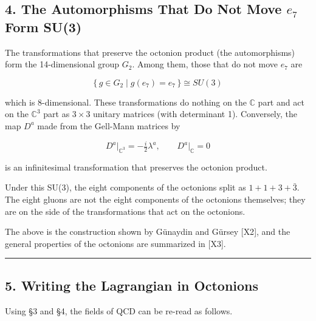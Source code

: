 \documentclass[
  a4paper,
]{article}
\begin{document}
\subsection{\texorpdfstring{4. The Automorphisms That Do Not Move
\(e_7\) Form
SU(3)}{4. The Automorphisms That Do Not Move e\_7 Form SU(3)}}\label{the-automorphisms-that-do-not-move-e_7-form-su3}

The transformations that preserve the octonion product (the
automorphisms) form the 14-dimensional group \(G_2\). Among them, those
that do not move \(e_7\) are

\[
\{\,g \in G_2 \mid g(e_7) = e_7\,\} \cong SU(3) \tag{4.1}
\]

which is 8-dimensional. These transformations do nothing on the
\(\mathbb{C}\) part and act on the \(\mathbb{C}^3\) part as \(3\times3\)
unitary matrices (with determinant 1). Conversely, the map \(D^a\) made
from the Gell-Mann matrices by

\[
D^a\big|_{\mathbb{C}^3} = -\tfrac{i}{2}\lambda^a,\qquad D^a\big|_{\mathbb{C}} = 0 \tag{4.2}
\]

is an infinitesimal transformation that preserves the octonion product.

Under this SU(3), the eight components of the octonions split as
\(1 + 1 + 3 + \bar 3\). The eight gluons are not the eight components of
the octonions themselves; they are on the side of the transformations
that act on the octonions.

The above is the construction shown by Günaydin and Gürsey {[}X2{]}, and
the general properties of the octonions are summarized in {[}X3{]}.

\begin{center}\rule{0.5\linewidth}{0.5pt}\end{center}

\subsection{5. Writing the Lagrangian in
Octonions}\label{writing-the-lagrangian-in-octonions}

Using §3 and §4, the fields of QCD can be re-read as follows.
\end{document}
